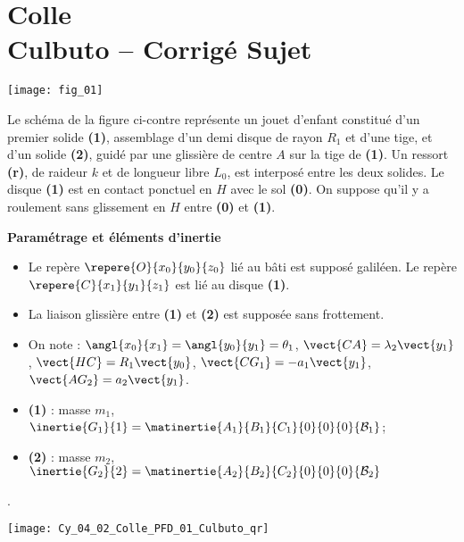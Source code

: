 \chapter*{Colle  \\ 
Culbuto -- \ifprof Corrigé \else Sujet \fi}

\iflivret {} \else
\ifprof  {} \else \fi
\fi

\setcounter{question}{0}



\begin{marginfigure}
\texttt{[image: fig\_01]}
\end{marginfigure}
Le schéma de la figure ci-contre représente un jouet d’enfant constitué d’un premier solide \textbf{(1)}, assemblage d’un demi disque de rayon $R_1$ et d’une tige, et d’un solide \textbf{(2)}, guidé par une glissière de centre $A$ sur la tige de \textbf{(1)}.
Un ressort \textbf{(r)}, de raideur $k$ et de longueur libre $L_0$, est interposé entre les deux solides.
Le disque \textbf{(1)} est en contact ponctuel en $H$ avec le sol \textbf{(0)}. On suppose qu’il y a roulement sans glissement en $H$ entre \textbf{(0)} et \textbf{(1)}.

\textbf{Paramétrage et éléments d'inertie}
\begin{itemize}
\item Le repère $\repere{O}{x_0}{y_0}{z_0}$ lié au bâti est supposé galiléen. Le repère $\repere{C}{x_1}{y_1}{z_1}$ est lié au disque \textbf{(1)}.
\item La liaison glissière entre \textbf{(1)} et \textbf{(2)} est supposée sans frottement.
\item On note : $\angl{x_0}{x_1}=\angl{y_0}{y_1}=\theta_1$, 
$\vect{CA}=\lambda_2\vect{y_1}$, 
$\vect{HC}=R_1\vect{y_0}$,  
$\vect{CG_1}=-a_1\vect{y_1}$,
$\vect{AG_2}=a_2\vect{y_1}$.
\item \textbf{(1)} : masse $m_1$, $\inertie{G_1}{1}=\matinertie{A_1}{B_1}{C_1}{0}{0}{0}{\mathcal{B}_1}$;
\item \textbf{(2)} : masse $m_2$, $\inertie{G_2}{2}=\matinertie{A_2}{B_2}{C_2}{0}{0}{0}{\mathcal{B}_2}$
\end{itemize}.



\ifprof
\else
\begin{marginfigure}
\centering
\texttt{[image: Cy\_04\_02\_Colle\_PFD\_01\_Culbuto\_qr]}
\end{marginfigure}
\fi



